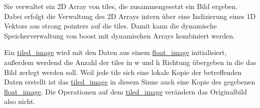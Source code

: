 Sie verwaltet ein 2\-D Array von tiles, die zusammengesetzt ein Bild ergeben. Dabei erfolgt die Verwaltung des 2\-D Arrays intern über eine Indizierung eines 1\-D Vektors aus strong pointers auf die tiles. Damit kann die dynamische Speicherverwaltung von boost mit dynamischen Arrays kombiniert werden.

Ein \hyperlink{classtiled__image}{tiled\-\_\-image} wird mit den Daten aus einem \hyperlink{classfloat__image}{float\-\_\-image} initialisiert, außerdem werdend die Anzahl der tiles in w und h Richtung übergeben in die das Bild zerlegt werden soll. Weil jede tile sich eine lokale Kopie der betreffenden Daten erstellt ist das \hyperlink{classtiled__image}{tiled\-\_\-image} in diesem Sinne auch eine Kopie des gegebenen \hyperlink{classfloat__image}{float\-\_\-image}. Die Operationen auf dem \hyperlink{classtiled__image}{tiled\-\_\-image} verändern das Originalbild also nicht. 

